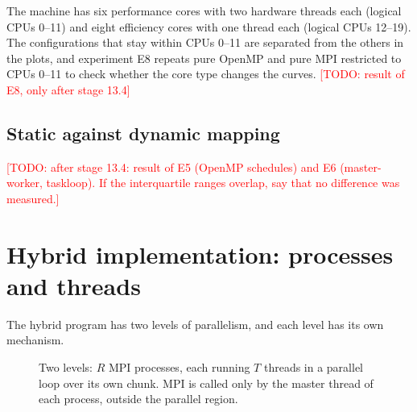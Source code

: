 \documentclass[11pt,a4paper]{article}
\newcommand{\todo}[1]{\textcolor{red}{[TODO: #1]}}
\begin{document}
The machine has six performance cores with two hardware threads each (logical CPUs 0--11) and eight efficiency cores with one thread each (logical CPUs 12--19). The configurations that stay within CPUs 0--11 are separated from the others in the plots, and experiment E8 repeats pure OpenMP and pure MPI restricted to CPUs 0--11 to check whether the core type changes the curves. \todo{result of E8, only after stage 13.4}

\subsection{Static against dynamic mapping}
\todo{after stage 13.4: result of E5 (OpenMP schedules) and E6 (master-worker, taskloop). If the interquartile ranges overlap, say that no difference was measured.}

\section{Hybrid implementation: processes and threads}

The hybrid program has two levels of parallelism, and each level has its own mechanism.

\begin{figure}[H]
\centering
{}
\caption{Two levels: $R$ MPI processes, each running $T$ threads in a parallel loop over its own chunk. MPI is called only by the master thread of each process, outside the parallel region.}
\end{figure}
\end{document}
